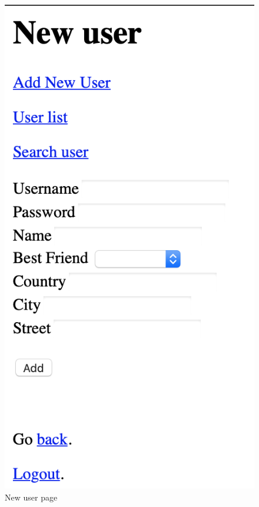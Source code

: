 \documentclass[a4paper]{report}
\begin{document}
	\begin{figure}[ht]
		\centering
		\includegraphics[scale=0.7]{images/newuser.png}
		\caption{New user page}
		\label{fig:new_user}
	\end{figure} 
	
\end{document}
